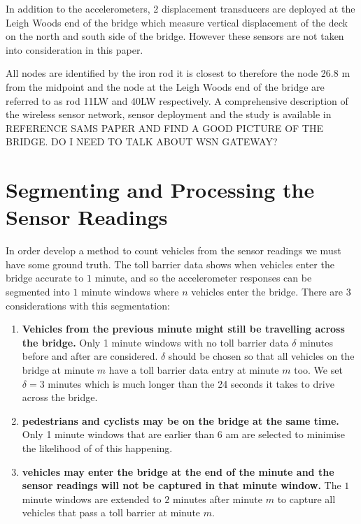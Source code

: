 \documentclass[a4paper,11pt,twocolumn]{article}
\begin{document}
In addition to the accelerometers, 2 displacement transducers are deployed at the Leigh Woods end of the bridge which measure vertical displacement of the deck on the north and south side of the bridge. However these sensors are not taken into consideration in this paper.

All nodes are identified by the iron rod it is closest to therefore the node 26.8 m from the midpoint and the node at the Leigh Woods end of the bridge are referred to as rod 11LW and 40LW respectively. A comprehensive description of the wireless sensor network, sensor deployment and the study is available in REFERENCE SAMS PAPER AND FIND A GOOD PICTURE OF THE BRIDGE. DO I NEED TO TALK ABOUT WSN GATEWAY?

\section{Segmenting and Processing the Sensor Readings}
In order develop a method to count vehicles from the sensor readings we must have some ground truth. The toll barrier data shows when vehicles enter the bridge accurate to $1$ minute, and so the accelerometer responses can be segmented into $1$ minute windows where $n$ vehicles enter the bridge. There are 3 considerations with this segmentation:

\begin{enumerate}
\item \textbf{Vehicles from the previous minute might still be travelling across the bridge.} Only 1 minute windows with no toll barrier data $\delta$ minutes before and after are considered. $\delta$ should be chosen so that all vehicles on the bridge at minute $m$ have a toll barrier data entry at minute $m$ too. We set $\delta = 3$ minutes which is much longer than the 24 seconds it takes to drive across the bridge. 

\item \textbf{pedestrians and cyclists may be on the bridge at the same time.} Only 1 minute windows that are earlier than $6$ am are selected to minimise the likelihood of of this happening.  

\item \textbf{vehicles may enter the bridge at the end of the minute and the sensor readings will not be captured in that minute window.} The $1$ minute windows are extended to $2$ minutes after minute $m$ to capture all vehicles that pass a toll barrier at minute $m$. 
\end{enumerate}
\end{document}
